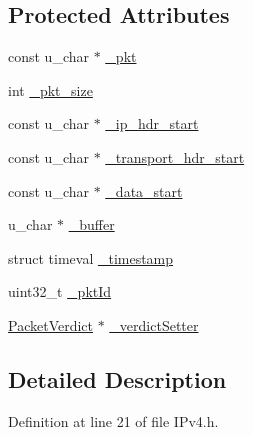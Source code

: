 \subsection*{Protected Attributes}
\begin{DoxyCompactItemize}
\item 
const u\-\_\-char $\ast$ \hyperlink{class_vsid_common_1_1_i_pv4_packet_ae39b78b3e02fe344d6a0aaa10bad55b6}{\-\_\-pkt}
\item 
int \hyperlink{class_vsid_common_1_1_i_pv4_packet_a2d4133be37c304ebf4951f975647a2f2}{\-\_\-pkt\-\_\-size}
\item 
const u\-\_\-char $\ast$ \hyperlink{class_vsid_common_1_1_i_pv4_packet_ab9d1ecb868ec5cd9f14e62b90edc05c8}{\-\_\-ip\-\_\-hdr\-\_\-start}
\item 
const u\-\_\-char $\ast$ \hyperlink{class_vsid_common_1_1_i_pv4_packet_adb6dc95e430636380d1f068dc4708def}{\-\_\-transport\-\_\-hdr\-\_\-start}
\item 
const u\-\_\-char $\ast$ \hyperlink{class_vsid_common_1_1_i_pv4_packet_a2caca73de76d8c86e9a003c459188b81}{\-\_\-data\-\_\-start}
\item 
u\-\_\-char $\ast$ \hyperlink{class_vsid_common_1_1_i_pv4_packet_a935c6b0cb3c3a0d4a90d825d68088c3a}{\-\_\-buffer}
\item 
struct timeval \hyperlink{class_vsid_common_1_1_i_pv4_packet_af9fee09107ca0376a36f307256f54df3}{\-\_\-timestamp}
\item 
uint32\-\_\-t \hyperlink{class_vsid_common_1_1_i_pv4_packet_a5967fced67bba49307c5f7de667b1ba4}{\-\_\-pkt\-Id}
\item 
\hyperlink{class_vsid_common_1_1_packet_verdict}{Packet\-Verdict} $\ast$ \hyperlink{class_vsid_common_1_1_i_pv4_packet_a71b0a5f7928f5ea0d6b5e1ab720f54cf}{\-\_\-verdict\-Setter}
\end{DoxyCompactItemize}


\subsection{Detailed Description}


Definition at line 21 of file I\-Pv4.\-h.



